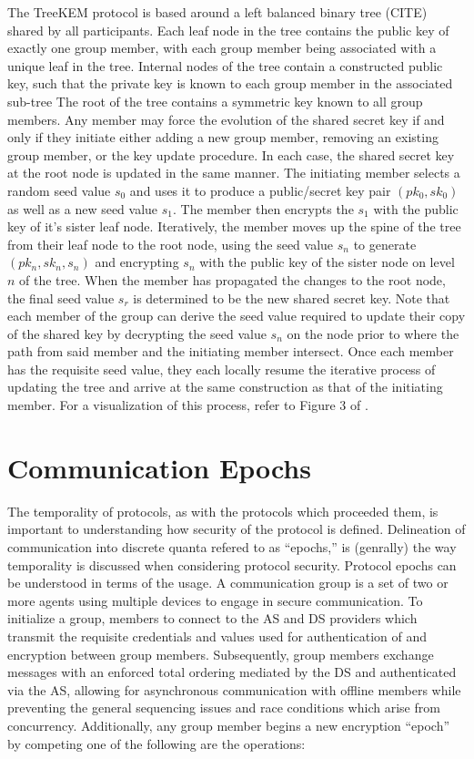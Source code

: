 The TreeKEM protocol is based around a left balanced binary tree (CITE) shared by all participants.
Each leaf node in the tree contains the public key of exactly one group member, with each group member being associated with a unique leaf in the tree.
Internal nodes of the tree contain a constructed public key, such that the private key is known to each group member in the associated sub-tree
The root of the tree contains a symmetric key known to all group members.
Any member may force the evolution of the shared secret key if and only if they initiate either adding a new group member, removing an existing group member, or the key update procedure.
In each case, the shared secret key at the root node is updated in the same manner.
The initiating member selects a random seed value \(s_0\) and uses it to produce a public/secret key pair \((pk_0,sk_0)\) as well as a new seed value \(s_1\).
The member then encrypts the \(s_1\) with the public key of it's sister leaf node.
Iteratively, the member moves up the spine of the tree from their leaf node to the root node, using the seed value \(s_n\) to generate \((pk_n,sk_n,s_n)\) and encrypting \(s_n\) with the public key of the sister node on level \(n\) of the tree.
When the member has propagated the changes to the root node, the final seed value \(s_r\) is determined to be the new shared secret key.
Note that each member of the group can derive the seed value required to update their copy of the shared key by decrypting the seed value \(s_n\) on the node prior to where the path from said member and the initiating member intersect.
Once each member has the requisite seed value, they each locally resume the iterative process of updating the tree and arrive at the same construction as that of the initiating member.
For a visualization of this process, refer to Figure 3 of \autocite{alwen2020security}.


\hypertarget{communication-epochs}{%
\section{Communication Epochs}\label{communication-epochs}}

The temporality of  protocols, as with the  protocols which proceeded them, is important to understanding how security of the protocol is defined.
Delineation of communication into discrete quanta refered to as ``epochs,'' is (genrally) the way temporality is discussed when considering protocol security.
Protocol epochs can be understood in terms of the  usage.
A communication group is a set of two or more agents using multiple devices to engage in secure communication.
To initialize a group, members to connect to the AS and DS providers which transmit the requisite credentials and values used for authentication of and encryption between group members.
Subsequently, group members exchange messages with an enforced total ordering mediated by the DS and authenticated via the AS, allowing for asynchronous communication with offline members while preventing the general sequencing issues and race conditions which arise from concurrency.
Additionally, any group member begins a new encryption ``epoch'' by competing one of the following are the operations:

